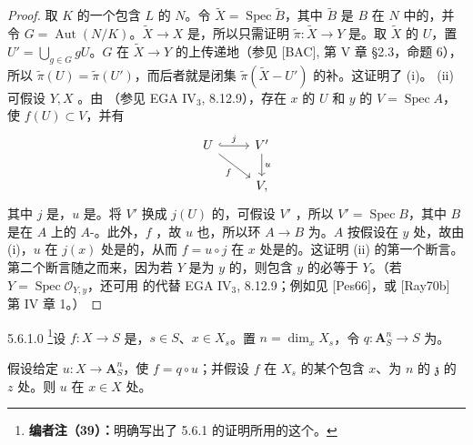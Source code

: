 \begin{proof}
取 $K$ 的一个包含 $L$ 的 $N$。令 $\widetilde X=\operatorname{Spec}\widetilde B$，其中 $\widetilde B$ 是 $B$ 在 $N$ 中的，并令 $G=\operatorname{Aut}(N/K)$。$\widetilde X\to X$ 是，所以只需证明 $\widetilde\pi:\widetilde X\to Y$ 是。取 $\widetilde X$ 的 $U$，置 $U'=\bigcup_{g\in G}gU$。$G$ 在 $\widetilde X\to Y$ 的上传递地（参见 [BAC], 第 V 章 \S2.3，命题 6），所以 $\widetilde\pi(U)=\widetilde\pi(U')$，而后者就是闭集 $\widetilde\pi(\widetilde X-U')$ 的补。这证明了 (i)。
(ii) 可假设 $Y,X$ 。由 （参见 EGA IV$_3$, 8.12.9），存在 $x$ 的 $U$ 和 $y$ 的 $V=\operatorname{Spec}A$，使 $f(U)\subset V$，并有
\[
\begin{tikzcd}
U\arrow[r,hook,"j"]\arrow[dr,"f"']&V'\arrow[d,"u"]\\
&V,
\end{tikzcd}
\]
其中 $j$ 是，$u$ 是。将 $V'$ 换成 $j(U)$ 的，可假设 $V'$ ，所以 $V'=\operatorname{Spec}B$，其中 $B$ 是在 $A$ 上的 $A$-。此外，$f$ ，故 $u$ 也，所以环 $A\to B$ 为。$A$ 按假设在 $y$ 处，故由 (i)，$u$ 在 $j(x)$ 处是的，从而 $f=u\circ j$ 在 $x$ 处是的。这证明 (ii) 的第一个断言。第二个断言随之而来，因为若 $Y$ 是为 $y$ 的，则包含 $y$ 的必等于 $Y$。（若 $Y=\operatorname{Spec}\mathcal O_{Y,y}$，还可用 的代替 EGA IV$_3$, 8.12.9；例如见 [Pes66]，或 [Ray70b] 第 IV 章 1。）
\end{proof}
\begin{SGAresult}{}{5.6.1.0}
\footnote{\textbf{编者注（39）：}明确写出了 5.6.1 的证明所用的这个。}设 $f:X\to S$ 是，$s\in S$、$x\in X_s$。置 $n=\dim_xX_s$，令 $q:\mathbf A_S^n\to S$ 为。

假设给定 $u:X\to\mathbf A_S^n$，使 $f=q\circ u$；并假设 $f$ 在 $X_s$ 的某个包含 $x$、为 $n$ 的 $\mathfrak z$ 的 $z$ 处。则 $u$ 在 $x\in X$ 处。
\end{SGAresult}
